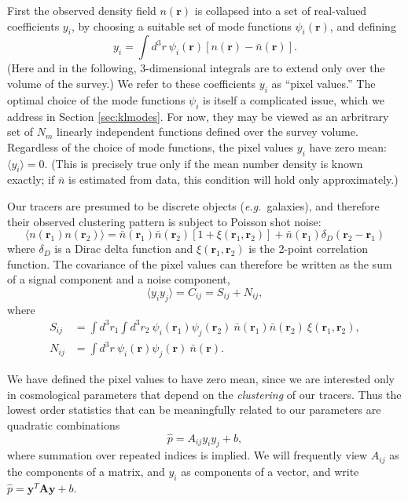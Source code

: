 \documentclass{article}
\newcommand{\eg}{\textit{e.g.}}
\renewcommand{\vec}[1]{\bm{#1}}
\newcommand{\mat}[1]{\mathbf{#1}}
\renewcommand{\r}{\vec{r}}
\begin{document}
First the observed density field $n(\r)$ is collapsed into a set of real-valued
coefficients $y_i$, by choosing a suitable set of mode functions
$\psi_i(\r)$, and defining
\begin{equation}
    y_i = \int d^3r~ \psi_i(\r) [n(\r) - \bar{n}(\r)].
\end{equation}
(Here and in the following, 3-dimensional integrals are to extend only over the
volume of the survey.)  We refer to these coefficients $y_i$ as ``pixel
values.''  The optimal choice of the mode functions $\psi_i$ is itself a
complicated issue, which we address in Section \ref{sec:klmodes}.  For now,
they may be viewed as an arbritrary set of $N_m$ linearly independent functions
defined over the survey volume.  Regardless of the choice of mode functions,
the pixel values $y_i$ have zero mean: $\langle y_i \rangle = 0$.  (This is
precisely true only if the mean number density is known exactly; if $\bar{n}$
is estimated from data, this condition will hold only approximately.)

Our tracers are presumed to be discrete objects (\eg~galaxies), and therefore
their observed clustering pattern is subject to Poisson shot noise:
\begin{equation}
    \langle n(\r_1) n(\r_2) \rangle =
        \bar{n}(\r_1) \bar{n}(\r_2) [1 + \xi(\r_1,\r_2)]
      + \bar{n}(\r_1) \delta_D(\r_2-\r_1)
\end{equation}
where $\delta_D$ is a Dirac delta function and $\xi(\r_1,\r_2)$ is the 2-point
correlation function.  The covariance of the pixel values can therefore be
written as the sum of a signal component and a noise component,
\begin{equation}
\label{eq:yiyj}
    \langle y_i y_j \rangle = C_{ij} = S_{ij} + N_{ij},
\end{equation}
where
\begin{align}
\label{eq:signal}
    S_{ij} &= \int d^3r_1 \int d^3r_2~ \psi_i(\r_1) \psi_j(\r_2)~ \bar{n}(\r_1) \bar{n}(\r_2)~ \xi(\r_1,\r_2), \\
\label{eq:noise}
    N_{ij} &= \int d^3r~ \psi_i(\r) \psi_j(\r)~ \bar{n}(\r).
\end{align}

We have defined the pixel values to have zero mean, since we are interested
only in cosmological parameters that depend on the \emph{clustering} of our
tracers.  Thus the lowest order statistics that can be meaningfully related
to our parameters are quadratic combinations
\begin{equation}
    \hat{p} = A_{ij} y_i y_j + b,
\end{equation}
where summation over repeated indices is implied.  We will frequently view
$A_{ij}$ as the components of a matrix, and $y_i$ as components of a vector,
and write $\hat{p} = \mat{y}^T \mat{A} \mat{y} + b$.
\end{document}
